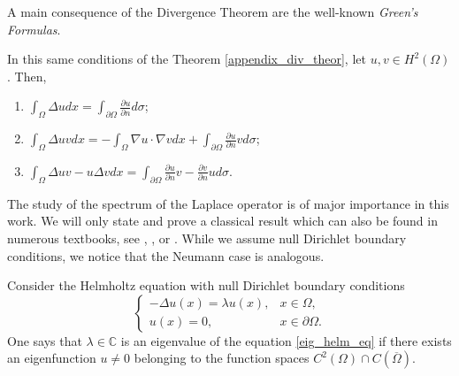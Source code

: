 A main consequence of the Divergence Theorem are the well-known \textit{Green's Formulas}.
\begin{corollary}
    In this same conditions of the Theorem \ref{appendix_div_theor}, let \(u, v \in H^2(\Omega)\). Then,
    \begin{enumerate}
        \item \(\int_\Omega \Delta u dx = \int_{\partial \Omega} \frac{\partial u}{\partial n} d\sigma\);
        \item \(\int_\Omega \Delta u v dx = -\int_\Omega \nabla u \cdot \nabla v dx + \int_{\partial \Omega} \frac{\partial u}{\partial n}v d\sigma\);
        \item \(\int_\Omega \Delta u v - u \Delta v dx= \int_{\partial \Omega} \frac{\partial u}{\partial n}v - \frac{\partial v}{\partial n}u d\sigma\).
    \end{enumerate}
\end{corollary}

The study of the spectrum of the Laplace operator is of major importance in this work. We will only state and prove a classical result which can also be found in numerous textbooks, see \cite{brezis2011functional}, \cite{arendt2010partielle}, \cite{courant2008methods} or \cite{borthwick2020spectral}. While we assume null Dirichlet boundary conditions, we notice that the Neumann case is analogous.

\begin{definition}\label{eig_def}
    Consider the Helmholtz equation with null Dirichlet boundary conditions
    \begin{equation}\label{eig_helm_eq}
        \begin{cases}
            -\Delta u(x) = \lambda u(x), & x \in \Omega, \\
            u(x) = 0, & x \in \partial \Omega.
        \end{cases}
    \end{equation}
    One says that \(\lambda \in \mathbb{C}\) is an eigenvalue of the equation \eqref{eig_helm_eq} if there exists an eigenfunction \(u \neq 0\) belonging to the function spaces \(C^2(\Omega) \cap C(\overline{\Omega})\).
\end{definition}

